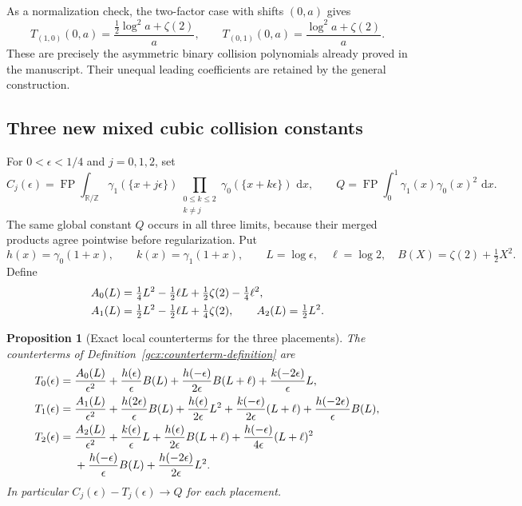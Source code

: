 \documentclass[11pt]{article}
\numberwithin{equation}{section}
\theoremstyle{plain}
\newtheorem{proposition}[theorem]{Proposition}
\theoremstyle{definition}
\theoremstyle{remark}
\DeclareMathOperator{\FP}{FP}
\newcommand{\R}{\mathbb R}
\newcommand{\Z}{\mathbb Z}
\newcommand{\dd}{\,\mathrm d}
\begin{document}
As a normalization check, the two-factor case with shifts $(0,a)$ gives
\[
 T_{(1,0)}(0,a)=\frac{\tfrac12\log^2a+\zeta(2)}a,\qquad
 T_{(0,1)}(0,a)=\frac{\log^2a+\zeta(2)}a.
\]
These are precisely the asymmetric binary collision polynomials already
proved in the manuscript.  Their unequal leading coefficients are
retained by the general construction.

\subsection{Three new mixed cubic collision constants}
\label{gcx:cubic}

For $0<\epsilon<1/4$ and $j=0,1,2$, set
\begin{equation}\label{gcx:Cj}
 C_j(\epsilon)=\FP\int_{\R/\Z}
  \gamma_1(\{x+j\epsilon\})
  \prod_{\substack{0\le k\le2\\ k\ne j}}
       \gamma_0(\{x+k\epsilon\})\,\dd x,
 \qquad
 Q=\FP\int_0^1\gamma_1(x)\gamma_0(x)^2\,\dd x.
\end{equation}
The same global constant $Q$ occurs in all three limits, because their
merged products agree pointwise before regularization.  Put
\[
 h(x)=\gamma_0(1+x),\qquad k(x)=\gamma_1(1+x),\qquad
 L=\log\epsilon,\quad \ell=\log2,\quad
 B(X)=\zeta(2)+\tfrac12X^2.
\]
Define
\begin{align}
 A_0(L)&=\tfrac14L^2-\tfrac12\ell L
                    +\tfrac12\zeta(2)-\tfrac14\ell^2,\notag\\
 A_1(L)&=\tfrac12L^2-\tfrac12\ell L+\tfrac14\zeta(2),
 \qquad A_2(L)=\tfrac12L^2.
 \label{gcx:Aj}
\end{align}

\begin{proposition}[Exact local counterterms for the three placements]
\label{gcx:three-T}
The counterterms of Definition~\ref{gcx:counterterm-definition} are
\begin{align}
 T_0(\epsilon)={}&\frac{A_0(L)}{\epsilon^2}
  +\frac{h(\epsilon)}\epsilon B(L)
  +\frac{h(-\epsilon)}{2\epsilon}B(L+\ell)
  +\frac{k(-2\epsilon)}\epsilon L,\label{gcx:T0}\\
 T_1(\epsilon)={}&\frac{A_1(L)}{\epsilon^2}
  +\frac{h(2\epsilon)}\epsilon B(L)
  +\frac{h(\epsilon)}{2\epsilon}L^2
  +\frac{k(-\epsilon)}{2\epsilon}(L+\ell)
  +\frac{h(-2\epsilon)}\epsilon B(L),\label{gcx:T1}\\
 T_2(\epsilon)={}&\frac{A_2(L)}{\epsilon^2}
  +\frac{k(\epsilon)}\epsilon L
  +\frac{h(\epsilon)}{2\epsilon}B(L+\ell)
  +\frac{h(-\epsilon)}{4\epsilon}(L+\ell)^2\notag\\
 &+\frac{h(-\epsilon)}\epsilon B(L)
  +\frac{h(-2\epsilon)}{2\epsilon}L^2.
 \label{gcx:T2}
\end{align}
In particular $C_j(\epsilon)-T_j(\epsilon)\to Q$ for each placement.
\end{proposition}
\end{document}
